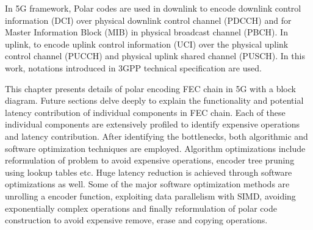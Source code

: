 In 5G framework, Polar codes are used in downlink to encode downlink control information (DCI) over physical downlink control channel (PDCCH) and for Master Information Block (MIB) in physical broadcast channel (PBCH). In uplink, to encode uplink control information (UCI) over the physical uplink control channel (PUCCH) and physical uplink shared channel (PUSCH). In this work, notations introduced in 3GPP technical specification\cite{3gpp.38.212} are used.

This chapter presents details of polar encoding FEC chain in 5G with a block diagram. Future sections delve deeply to explain the functionality and potential latency contribution of individual components in FEC chain. Each of these individual components are extensively profiled to identify expensive operations and latency contribution. After identifying the bottlenecks, both algorithmic and software optimization techniques are employed. Algorithm optimizations include reformulation of problem to avoid expensive operations, encoder tree pruning using lookup tables etc. Huge latency reduction is achieved through software optimizations as well. Some of the major software optimization methods are unrolling a encoder function, exploiting data parallelism with SIMD, avoiding exponentially complex operations and finally reformulation of polar code construction to avoid expensive remove, erase and copying operations.


